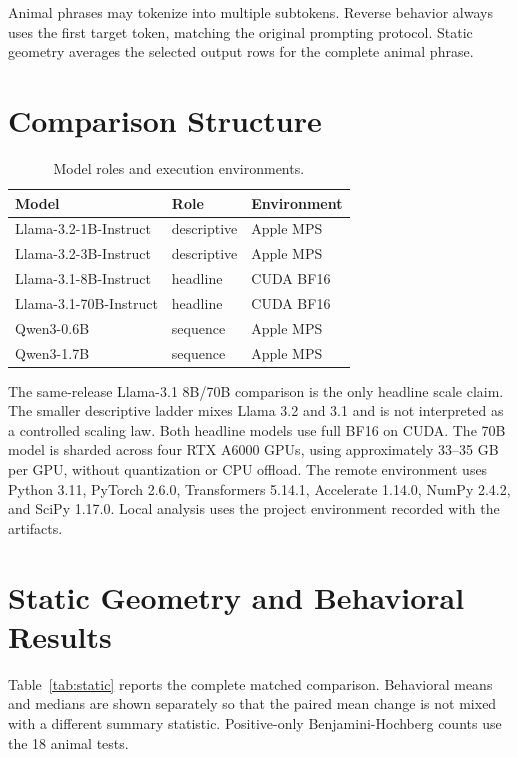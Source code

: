 \documentclass[letterpaper]{article}
\begin{document}
Animal phrases may tokenize into multiple subtokens. Reverse behavior always
uses the first target token, matching the original prompting protocol. Static
geometry averages the selected output rows for the complete animal phrase.

\section{Comparison Structure}

\begin{table}[t]
\centering
\caption{Model roles and execution environments.}
\label{tab:models}
\begin{tabular}{lll}
\toprule
Model & Role & Environment \\
\midrule
Llama-3.2-1B-Instruct & descriptive & Apple MPS \\
Llama-3.2-3B-Instruct & descriptive & Apple MPS \\
Llama-3.1-8B-Instruct & headline & CUDA BF16 \\
Llama-3.1-70B-Instruct & headline & CUDA BF16 \\
Qwen3-0.6B & sequence & Apple MPS \\
Qwen3-1.7B & sequence & Apple MPS \\
\bottomrule
\end{tabular}
\end{table}

The same-release Llama-3.1 8B/70B comparison is the only headline scale claim.
The smaller descriptive ladder mixes Llama 3.2 and 3.1 and is not interpreted as
a controlled scaling law. Both headline models use full BF16 on CUDA. The 70B
model is sharded across four RTX A6000 GPUs, using approximately 33--35 GB per
GPU, without quantization or CPU offload. The remote environment uses Python
3.11, PyTorch 2.6.0, Transformers 5.14.1, Accelerate 1.14.0, NumPy 2.4.2, and
SciPy 1.17.0. Local analysis uses the project environment recorded with the
artifacts.

\section{Static Geometry and Behavioral Results}

Table~\ref{tab:static} reports the complete matched comparison. Behavioral
means and medians are shown separately so that the paired mean change is not
mixed with a different summary statistic.
Positive-only Benjamini-Hochberg counts use the 18 animal tests.
\end{document}
